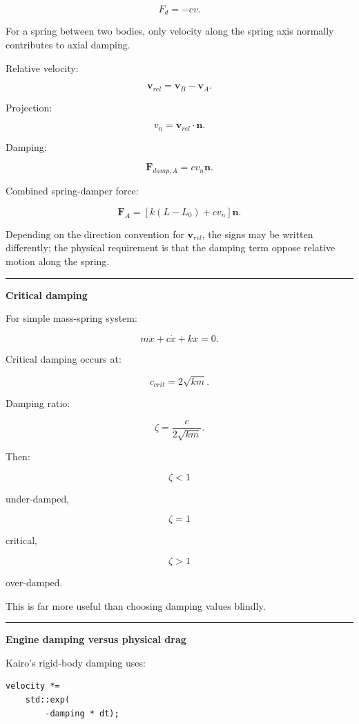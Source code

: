 \[
\boxed{
F_d=-cv.
}
\]

For a spring between two bodies, only velocity along the spring axis normally contributes to axial damping.

Relative velocity:

\[
\mathbf{v}_{rel}
=
\mathbf{v}_B-\mathbf{v}_A.
\]

Projection:

\[
v_n
=
\mathbf{v}_{rel}\cdot\mathbf{n}.
\]

Damping:

\[
\mathbf{F}_{damp,A}
=
c v_n\mathbf{n}.
\]

Combined spring-damper force:

\[
\boxed{
\mathbf{F}_A
=
\left[
k(L-L_0)
+
cv_n
\right]\mathbf{n}.
}
\]

Depending on the direction convention for \(\mathbf{v}_{rel}\), the signs may be written differently; the physical requirement is that the damping term oppose relative motion along the spring.

\begin{center}\rule{0.5\linewidth}{0.5pt}\end{center}

\textbf{Critical damping}

For simple mass-spring system:

\[
m\ddot x+
c\dot x+
kx=0.
\]

Critical damping occurs at:

\[
\boxed{
c_{crit}
=
2\sqrt{km}.
}
\]

Damping ratio:

\[
\zeta
=
\frac{c}
{2\sqrt{km}}.
\]

Then:

\[
\zeta<1
\]

under-damped,

\[
\zeta=1
\]

critical,

\[
\zeta>1
\]

over-damped.

This is far more useful than choosing damping values blindly.

\begin{center}\rule{0.5\linewidth}{0.5pt}\end{center}

\textbf{Engine damping versus physical drag}

Kairo's rigid-body damping uses:

\begin{verbatim}
velocity *=
    std::exp(
        -damping * dt);
\end{verbatim}

